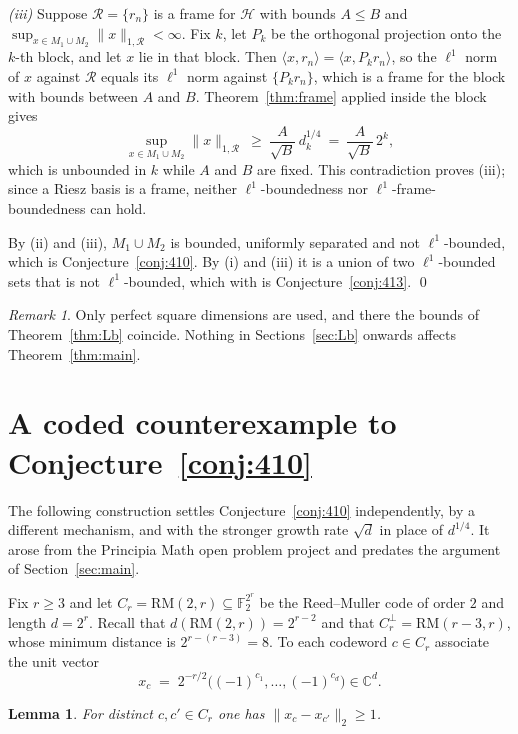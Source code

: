\documentclass[11pt,reqno]{amsart}
\theoremstyle{plain}
\newtheorem{lemma}[theorem]{Lemma}
\theoremstyle{definition}
\theoremstyle{remark}
\newtheorem{remark}[theorem]{Remark}
\newcommand{\C}{\mathbb{C}}
\newcommand{\HH}{\mathcal{H}}
\newcommand{\RM}{\mathrm{RM}}
\begin{document}
\emph{(iii)}  Suppose $\mathcal{R}=\{r_n\}$ is a frame for $\HH$ with
bounds $A\le B$ and $\sup_{x\in M_1\cup M_2}\|x\|_{1,\mathcal{R}}<\infty$.
Fix $k$, let $P_k$ be the orthogonal projection onto the $k$-th block,
and let $x$ lie in that block.  Then
$\langle x,r_n\rangle=\langle x,P_kr_n\rangle$, so the $\ell^1$ norm of
$x$ against $\mathcal{R}$ equals its $\ell^1$ norm against
$\{P_kr_n\}$, which is a frame for the block with bounds between $A$ and
$B$.  Theorem~\ref{thm:frame} applied inside the block gives
\[
  \sup_{x\in M_1\cup M_2}\|x\|_{1,\mathcal{R}}
  \ \ge\ \frac{A}{\sqrt B}\,d_k^{1/4}
  \ =\ \frac{A}{\sqrt B}\,2^{k},
\]
which is unbounded in $k$ while $A$ and $B$ are fixed.  This
contradiction proves (iii); since a Riesz basis is a frame, neither
$\ell^1$-boundedness nor $\ell^1$-frame-boundedness can hold.

By (ii) and (iii), $M_1\cup M_2$ is bounded, uniformly separated and not
$\ell^1$-bounded, which is Conjecture~\ref{conj:410}.  By (i) and (iii)
it is a union of two $\ell^1$-bounded sets that is not $\ell^1$-bounded,
which with \cite[Lem.~4.11]{HeilYu} is Conjecture~\ref{conj:413}. \qed

\begin{remark}
Only perfect square dimensions are used, and there the bounds of
Theorem~\ref{thm:Lb} coincide.  Nothing in Sections~\ref{sec:Lb}
onwards affects Theorem~\ref{thm:main}.
\end{remark}

\section{A coded counterexample to Conjecture~\ref{conj:410}}
\label{sec:rm}

The following construction settles Conjecture~\ref{conj:410}
independently, by a different mechanism, and with the stronger growth
rate $\sqrt d$ in place of $d^{1/4}$.  It arose from the Principia Math
open problem project and predates the argument of
Section~\ref{sec:main}.

Fix $r\ge3$ and let $C_r=\RM(2,r)\subseteq\mathbb{F}_2^{2^r}$ be the
Reed--Muller code of order $2$ and length $d=2^r$.  Recall
\cite{MacWilliamsSloane} that $d(\RM(2,r))=2^{r-2}$ and that
$C_r^{\perp}=\RM(r-3,r)$, whose minimum distance is
$2^{r-(r-3)}=8$.  To each codeword $c\in C_r$ associate the unit vector
\[
  x_c\;=\;2^{-r/2}\bigl((-1)^{c_1},\ldots,(-1)^{c_d}\bigr)\in\C^d .
\]

\begin{lemma}\label{lem:rmsep}
For distinct $c,c'\in C_r$ one has $\|x_c-x_{c'}\|_2\ge1$.
\end{lemma}
\end{document}
